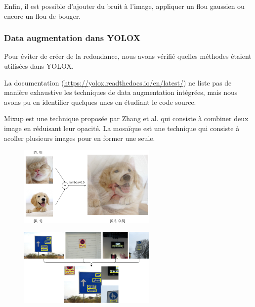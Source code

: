 Enfin, il est possible d'ajouter du bruit à l'image, appliquer un flou gaussien ou encore
un flou de bouger.

\subsubsection{Data augmentation dans YOLOX}

Pour éviter de créer de la redondance, nous avons vérifié quelles méthodes étaient utilisées dans YOLOX. 

La documentation (\url{https://yolox.readthedocs.io/en/latest/}) ne liste pas de manière
exhaustive les techniques de data augmentation intégrées, mais nous avons pu en identifier quelques unes
en étudiant le code source.

Mixup est une technique proposée par Zhang et al. \cite{Zhang_Cisse_Dauphin_Lopez-Paz_2018} qui consiste à combiner
deux image en réduisant leur opacité. La mosaïque est une technique qui consiste à
acoller plusieurs images pour en former une seule.

\begin{figure}[H]
    \centering
    \begin{minipage}{.5\textwidth}
      \centering
      \includegraphics[width=0.6\textwidth]{./img/mixup_augmentation.png}
      \label{fig:test1}
    \end{minipage}%
    \begin{minipage}{.5\textwidth}
      \centering
      \includegraphics[width=0.6\textwidth]{./img/mosaic_augmentation.png}
      \label{fig:test2}
    \end{minipage}
\end{figure}

